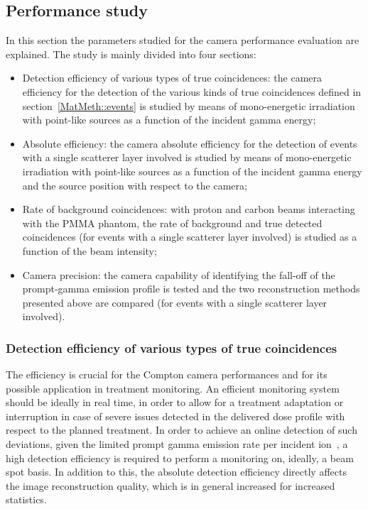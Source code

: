 \subsection{Performance study}
\label{MatMeth:performance}
In this section the parameters studied for the camera performance evaluation are explained. The study is mainly divided into four sections:
\begin{itemize}
\item Detection efficiency of various types of true coincidences: the camera efficiency for the detection of the various kinds of true coincidences defined in section~\ref{MatMeth::events} is studied by means of mono-energetic irradiation with point-like sources as a function of the incident gamma energy;
\item Absolute efficiency: the camera absolute efficiency for the detection of events with a single scatterer layer involved is studied by means of mono-energetic irradiation with point-like sources as a function of the incident gamma energy and the source position with respect to the camera;
\item Rate of background coincidences: with proton and carbon beams interacting with the PMMA phantom, the rate of background and true detected coincidences (for events with a single scatterer layer involved) is studied as a function of the beam intensity;
\item Camera precision: the camera capability of identifying the fall-off of the prompt-gamma emission profile is tested and the two reconstruction methods presented above are compared (for events with a single scatterer layer involved). 
\end{itemize}

\subsubsection{Detection efficiency of various types of true coincidences}\label{relEff}
The efficiency is crucial for the Compton camera performances and for its possible application in treatment monitoring. An efficient monitoring system should be ideally in real time, in order to allow for a treatment adaptation or interruption in case of severe issues detected in the delivered dose profile with respect to the planned treatment. In order to achieve an online detection of such deviations, given the limited prompt gamma emission rate per incident ion~\cite{Ortega:2015aa}, a high detection efficiency is required to perform a monitoring on, ideally, a beam spot basis. In addition to this, the absolute detection efficiency directly affects the image reconstruction quality, which is in general increased for increased statistics.

